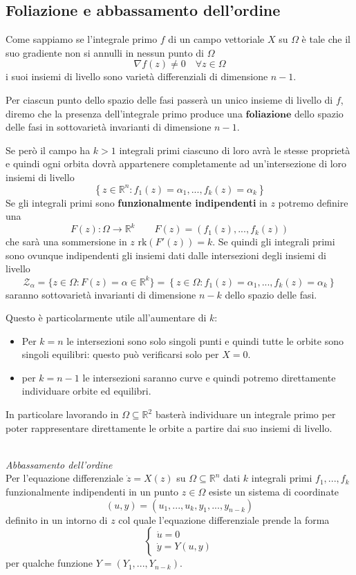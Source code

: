 \documentclass[11pt,a4paper,twoside]{book}
\newenvironment{proposizione}[1][\empty]{\begin{Proposizione}{
\ifx\empty#1\relax\else\mdseries\itshape#1\\\fi
}{}}{\end{Proposizione}}
\theoremstyle{esss}
\theoremstyle{dotless}
\numberwithin{equation}{section} %
\begin{document}
\subsection{Foliazione e abbassamento dell'ordine}\label{sezFoliazione}

Come sappiamo se l'integrale primo $f$ di un campo vettoriale $X$ su $\Omega$ è tale che il suo gradiente non si annulli in nessun punto di $\Omega$
\[
\nabla f (z)\neq 0\quad \forall z\in\Omega
\]
i suoi insiemi di livello sono varietà differenziali di dimensione $n-1$.

Per ciascun punto dello spazio delle fasi passerà un unico insieme di livello di $f$, diremo che la presenza dell'integrale primo produce una $\textbf{foliazione}$ dello spazio delle fasi in sottovarietà invarianti di dimensione $n-1$.

Se però il campo ha $k>1$ integrali primi ciascuno di loro avrà le stesse proprietà e quindi ogni orbita dovrà appartenere completamente ad un'intersezione di loro insiemi di livello
\[
\left\{ z\in\mathbb{R}^n:f_1(z)=\alpha_1,...,f_k(z)=\alpha_k \right\}
\]
Se gli integrali primi sono \textbf{funzionalmente indipendenti} in $z$ potremo definire una  
\[
F(z):\Omega\rightarrow\mathbb{R}^k \qquad F(z)=\left(f_1(z),...,f_k(z)\right)
\] 
che sarà una sommersione in $z$ $\text{rk}(F'(z))=k$. Se quindi gli integrali primi sono ovunque indipendenti gli insiemi dati dalle intersezioni degli insiemi di livello
\begin{equation}
\mathcal{Z}_\alpha=\{ z\in\Omega:F(z)=\alpha\in\mathbb{R}^k \}=\left\{ z\in\Omega:f_1(z)=\alpha_1,...,f_k(z)=\alpha_k \right\}
\end{equation}
saranno sottovarietà invarianti di dimensione $n-k$ dello spazio delle fasi.

Questo è particolarmente utile all'aumentare di $k$:
\begin{itemize}
\item Per $k=n$ le intersezioni sono solo singoli punti e quindi tutte le orbite sono singoli equilibri: questo può verificarsi solo per $X=0$.
\item per $k=n-1$ le intersezioni saranno curve e quindi potremo direttamente individuare orbite ed equilibri.
\end{itemize}

In particolare lavorando in $\Omega\subseteq\mathbb{R}^2$ basterà individuare un integrale primo per poter rappresentare direttamente le orbite a partire dai suo insiemi di livello.

\begin{proposizione}\textit{Abbassamento dell'ordine}\\
Per l'equazione differenziale $\dot{z}=X(z)$ su $\Omega\subseteq\mathbb{R}^n$ dati $k$ integrali primi $f_1,...,f_k$ funzionalmente indipendenti in un punto $z\in\Omega$ esiste un sistema di coordinate
\[
(u,y)=(u_1,...,u_k,y_1,...,y_{n-k})
\]
definito in un intorno di $z$ col quale l'equazione differenziale prende la forma
\[
\begin{cases}
\dot{u}=0 \\
\dot{y}=Y(u,y)
\end{cases}
\]
per qualche funzione $Y=(Y_1,...,Y_{n-k})$.
\end{proposizione}
\end{document}
